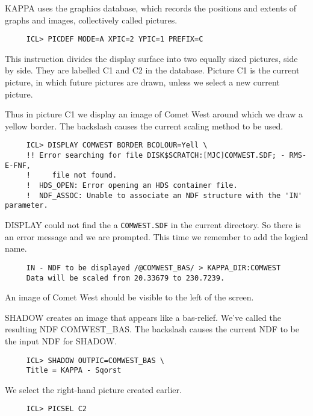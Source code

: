 {\small KAPPA} uses the graphics database, which records the positions
and extents of graphs and images, collectively called pictures.

\small
\begin{verbatim}
     ICL> PICDEF MODE=A XPIC=2 YPIC=1 PREFIX=C
\end{verbatim}
\normalsize

This instruction divides the display surface into two equally sized
pictures, side by side.  They are labelled C1 and C2 in the database.
Picture C1 is the current picture, in which future pictures are drawn,
unless we select a new current picture.

Thus in picture C1 we display an image of Comet West around which we
draw a yellow border.  The backslash causes the current scaling method
to be used.

\small
\begin{verbatim}
     ICL> DISPLAY COMWEST BORDER BCOLOUR=Yell \
     !! Error searching for file DISK$SCRATCH:[MJC]COMWEST.SDF; - RMS-E-FNF,
     !     file not found.
     !  HDS_OPEN: Error opening an HDS container file.
     !  NDF_ASSOC: Unable to associate an NDF structure with the 'IN' parameter.
\end{verbatim}
\normalsize

DISPLAY could not find the a {\tt COMWEST.SDF} in the current directory.
So there is an error message and we are prompted.  This time we remember
to add the logical name.

\small
\begin{verbatim}
     IN - NDF to be displayed /@COMWEST_BAS/ > KAPPA_DIR:COMWEST
     Data will be scaled from 20.33679 to 230.7239.
\end{verbatim}
\normalsize
An image of Comet West should be visible to the left of the screen.

SHADOW creates an image that appears like a bas-relief.  We've called
the resulting NDF COMWEST\_BAS.  The backslash causes the current NDF
to be the input NDF for SHADOW.

\small
\begin{verbatim}
     ICL> SHADOW OUTPIC=COMWEST_BAS \
     Title = KAPPA - Sqorst
\end{verbatim}
\normalsize

We select the right-hand picture created earlier.

\small
\begin{verbatim}
     ICL> PICSEL C2
\end{verbatim}
\normalsize

